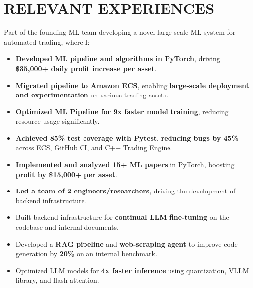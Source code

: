 \section{RELEVANT EXPERIENCES}

{
}
Part of the founding ML team developing a novel large-scale ML system for automated trading, where I:
\begin{itemize}
    \item \textbf{Developed ML pipeline and algorithms in PyTorch}, driving \textbf{\$35,000+ daily profit increase per asset}.
    \item \textbf{Migrated pipeline to Amazon ECS}, enabling \textbf{large-scale deployment and experimentation} on various trading assets.
    \item \textbf{Optimized ML Pipeline for 9x faster model training}, reducing resource usage significantly.
    \item  \textbf{Achieved 85\% test coverage with Pytest}, \textbf{reducing bugs by 45\%} across ECS, GitHub CI, and C++ Trading Engine.
    \item \textbf{Implemented and analyzed 15+ ML papers} in PyTorch, boosting \textbf{profit by \$15,000+ per asset}.
\end{itemize}

{
}
\begin{itemize}
    \item \textbf{Led a team of 2 engineers/researchers}, driving the development of backend infrastructure.
    \item Built backend infrastructure for \textbf{continual LLM fine-tuning} on the codebase and internal documents.
    \item Developed a \textbf{RAG pipeline} and \textbf{web-scraping agent} to improve code generation by \textbf{20\%} on an internal benchmark.
    \item Optimized LLM models for \textbf{4x faster inference} using quantization, VLLM library, and flash-attention.
\end{itemize}

